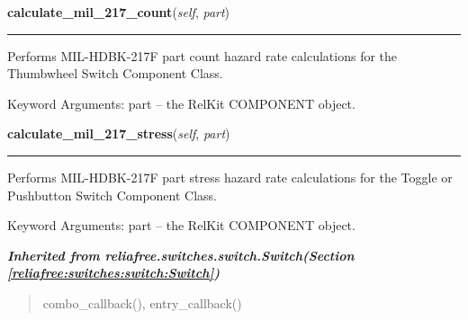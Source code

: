 \hspace{.8\funcindent}\begin{boxedminipage}{\funcwidth}

    \raggedright \textbf{calculate\_mil\_217\_count}(\textit{self}, \textit{part})

    \vspace{-1.5ex}

    \rule{\textwidth}{0.5\fboxrule}
\setlength{\parskip}{2ex}
    Performs MIL-HDBK-217F part count hazard rate calculations for the 
    Thumbwheel Switch Component Class.

    Keyword Arguments: part -- the RelKit COMPONENT object.

\setlength{\parskip}{1ex}
    \end{boxedminipage}

    \label{reliafree:switches:thumbwheel:Thumbwheel:calculate_mil_217_stress}

    \vspace{0.5ex}

\hspace{.8\funcindent}\begin{boxedminipage}{\funcwidth}

    \raggedright \textbf{calculate\_mil\_217\_stress}(\textit{self}, \textit{part})

    \vspace{-1.5ex}

    \rule{\textwidth}{0.5\fboxrule}
\setlength{\parskip}{2ex}
    Performs MIL-HDBK-217F part stress hazard rate calculations for the 
    Toggle or Pushbutton Switch Component Class.

    Keyword Arguments: part -- the RelKit COMPONENT object.

\setlength{\parskip}{1ex}
    \end{boxedminipage}


\large{\textbf{\textit{Inherited from reliafree.switches.switch.Switch\textit{(Section \ref{reliafree:switches:switch:Switch})}}}}

\begin{quote}
combo\_callback(), entry\_callback()
\end{quote}
